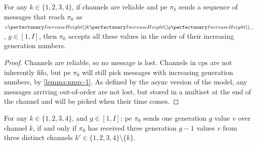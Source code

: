 \begin{lemma}\label{lemma:nmp:-2}
    For any $k \in \{ 1, 2, 3, 4 \}$, if channels are reliable and \gls{pe} $\pi_k$ sends a sequence of messages that reach $\pi_0$ as $\cpvv{k}{g}{\cpdiscard}$, $g \in [1,I]$, 
    then $\pi_0$ accepts all these values in the order of their increasing generation numbers.
\end{lemma}

\begin{proof}
    Channels are reliable, so no message is lost. Channels in \gls{cps} are not inherently \gls{fifo}, but \gls{pe} $\pi_0$ will still pick messages with increasing generation numbers, by \cref{lemma:nmp:-1}.
    As defined by the async version of the model, any messages arriving out-of-order are not lost, but stored in a multiset at the end of the channel
    and will be picked when their time comes.
\end{proof}

\begin{lemma}\label{lemma:nmp:-3}
    For any $k \in \{ 1, 2, 3, 4 \}$, and $g \in [1, I]$: \gls{pe} $\pi_0$ sends one generation $g$ value $v$ over channel $k$, if and only if $\pi_0$ has received three generation $g-1$ values $v$ from three distinct channels $k' \in 
    \{ 1, 2, 3, 4 \} \setminus \{ k \}$.
\end{lemma}

